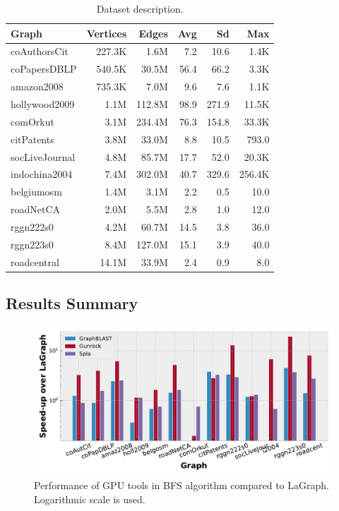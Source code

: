 \begin{table}[tbp]
\caption{Dataset description.} 
\begin{center}
    \begin{tabular}{|l|r|r|r|r|r|}
    \hline
    Graph&Vertices&Edges&Avg&Sd&Max\\
    \hline
    \hline
    coAuthorsCit&227.3K&1.6M&7.2&10.6&1.4K\\
    coPapersDBLP&540.5K&30.5M&56.4&66.2&3.3K\\
    amazon2008&735.3K&7.0M&9.6&7.6&1.1K\\
    hollywood2009&1.1M&112.8M&98.9&271.9&11.5K\\
    comOrkut&3.1M&234.4M&76.3&154.8&33.3K\\
    citPatents&3.8M&33.0M&8.8&10.5&793.0\\
    socLiveJournal&4.8M&85.7M&17.7&52.0&20.3K\\
    indochina2004&7.4M&302.0M&40.7&329.6&256.4K\\
    \hline
    belgiumosm&1.4M&3.1M&2.2&0.5&10.0\\
    roadNetCA&2.0M&5.5M&2.8&1.0&12.0\\
    rggn222s0&4.2M&60.7M&14.5&3.8&36.0\\
    rggn223s0&8.4M&127.0M&15.1&3.9&40.0\\
    roadcentral&14.1M&33.9M&2.4&0.9&8.0\\
    \hline
    \end{tabular}
    \label{dataset:info}
\end{center}
\end{table}

\subsection{Results Summary}

\begin{figure}[tbp]
\centering
\includegraphics[width=0.9\linewidth]{plots/rq1_rel_bfs.pdf}
\caption{Performance of GPU tools in BFS algorithm compared to LaGraph. Logarithmic scale is used.}
\label{fig:rq1_bfs}
\end{figure}

